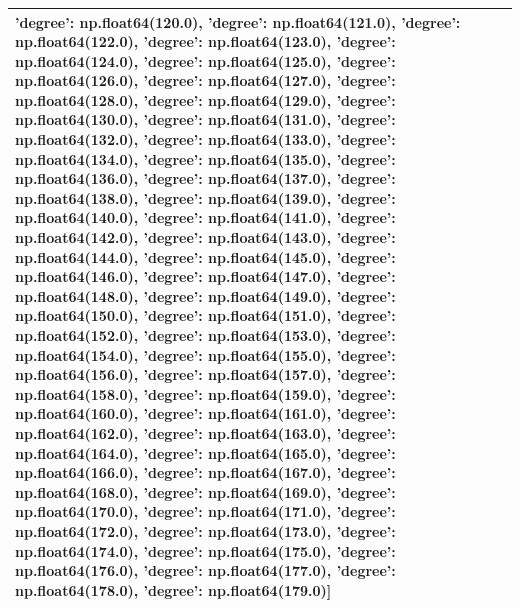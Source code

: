 \documentclass[parskip=half]{scrartcl}
\begin{document}
\begin{tabular}{l|l}
{'degree': np.float64(120.0)}, {'degree': np.float64(121.0)}, {'degree': np.float64(122.0)}, {'degree': np.float64(123.0)}, {'degree': np.float64(124.0)}, {'degree': np.float64(125.0)}, {'degree': np.float64(126.0)}, {'degree': np.float64(127.0)}, {'degree': np.float64(128.0)}, {'degree': np.float64(129.0)}, {'degree': np.float64(130.0)}, {'degree': np.float64(131.0)}, {'degree': np.float64(132.0)}, {'degree': np.float64(133.0)}, {'degree': np.float64(134.0)}, {'degree': np.float64(135.0)}, {'degree': np.float64(136.0)}, {'degree': np.float64(137.0)}, {'degree': np.float64(138.0)}, {'degree': np.float64(139.0)}, {'degree': np.float64(140.0)}, {'degree': np.float64(141.0)}, {'degree': np.float64(142.0)}, {'degree': np.float64(143.0)}, {'degree': np.float64(144.0)}, {'degree': np.float64(145.0)}, {'degree': np.float64(146.0)}, {'degree': np.float64(147.0)}, {'degree': np.float64(148.0)}, {'degree': np.float64(149.0)}, {'degree': np.float64(150.0)}, {'degree': np.float64(151.0)}, {'degree': np.float64(152.0)}, {'degree': np.float64(153.0)}, {'degree': np.float64(154.0)}, {'degree': np.float64(155.0)}, {'degree': np.float64(156.0)}, {'degree': np.float64(157.0)}, {'degree': np.float64(158.0)}, {'degree': np.float64(159.0)}, {'degree': np.float64(160.0)}, {'degree': np.float64(161.0)}, {'degree': np.float64(162.0)}, {'degree': np.float64(163.0)}, {'degree': np.float64(164.0)}, {'degree': np.float64(165.0)}, {'degree': np.float64(166.0)}, {'degree': np.float64(167.0)}, {'degree': np.float64(168.0)}, {'degree': np.float64(169.0)}, {'degree': np.float64(170.0)}, {'degree': np.float64(171.0)}, {'degree': np.float64(172.0)}, {'degree': np.float64(173.0)}, {'degree': np.float64(174.0)}, {'degree': np.float64(175.0)}, {'degree': np.float64(176.0)}, {'degree': np.float64(177.0)}, {'degree': np.float64(178.0)}, {'degree': np.float64(179.0)}] \\ \hline

\end{tabular}
\end{document}
